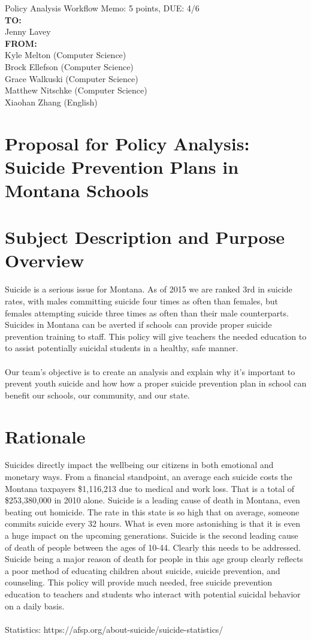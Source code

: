\documentclass[10pt,letterpaper]{article}
\author{Brock Ellefson}
\begin{document}
Policy Analysis Workflow Memo: 5 points, DUE: 4/6 
\\
\textbf{TO:}\\ Jenny Lavey\\
\textbf{FROM:}\\
      Kyle Melton (Computer Science)\\
      Brock Ellefson (Computer Science)\\
      Grace Walkuski (Computer Science)\\
      Matthew Nitschke (Computer Science)\\
      Xiaohan Zhang (English)\\
          
\section*{Proposal for Policy Analysis: Suicide Prevention Plans in Montana Schools}
\section*{Subject Description and Purpose Overview}
Suicide is a serious issue for Montana. As of 2015 we are ranked 3rd in suicide rates,  with males committing suicide four times as often than females, but females attempting suicide three times as often than their male counterparts. Suicides in Montana can be averted if schools can provide proper suicide prevention training to staff. This policy will give teachers the needed education to to assist potentially suicidal students in a healthy, safe manner.\\
\\
Our team's objective is to create an analysis and explain why it's important to prevent youth suicide and how how a proper suicide prevention plan in school can benefit our schools, our community, and our state.

\section*{Rationale} 
Suicides directly impact the wellbeing our citizens in both emotional and monetary ways. From a financial standpoint, an average each suicide costs the Montana taxpayers \$1,116,213 due to medical and work loss. That is a total of \$253,380,000 in 2010 alone. Suicide is a leading cause of death in Montana, even beating out homicide. The rate in this state is so high that on average, someone commits suicide every 32 hours. What is even more astonishing is that it is even a huge impact on the upcoming generations. Suicide is the second leading cause of death of people between the ages of 10-44. Clearly this needs to be addressed. Suicide being a major reason of death for people in this age group clearly reflects a poor method of educating children about suicide, suicide prevention, and counseling.  This policy will provide much needed, free suicide prevention education to teachers and students who interact with potential suicidal behavior on a daily basis.\\ 
\\
Statistics: https://afsp.org/about-suicide/suicide-statistics/ 
\end{document}
